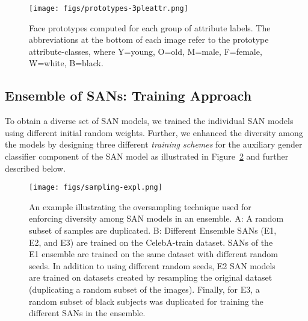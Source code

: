 \documentclass[10pt,twocolumn,letterpaper]{article}
\begin{document}
\begin{figure}
\begin{center}
   \texttt{[image: figs/prototypes-3pleattr.png]}
\end{center}
   \caption{Face prototypes computed for each group of  attribute labels. The abbreviations at the bottom of each image refer to the prototype attribute-classes, where Y=young, O=old, M=male, F=female, W=white, B=black.}
\label{fig:gender-prototypes}
\end{figure}

\subsection{Ensemble of SANs: Training Approach}

To obtain a diverse set of SAN models, we trained the individual SAN models using different initial random weights. Further, we enhanced the diversity among the models by designing three different {\em training schemes} for the auxiliary gender classifier component of the SAN model as illustrated in Figure~\ref{fig:example-oversampling} and further described below.

\begin{figure}
\begin{center}
   \texttt{[image: figs/sampling-expl.png]}
\end{center}
   \caption{An example illustrating the oversampling technique used for enforcing diversity among SAN models in an ensemble. A: A random subset of samples are duplicated. B: Different Ensemble SANs (E1, E2, and E3) are trained on the CelebA-train dataset. SANs of the E1 ensemble are trained on the same dataset with different random seeds. In addition to using different random seeds, E2 SAN models are trained on datasets created by resampling the original dataset (duplicating a random subset of the images). Finally, for E3, a random subset of black subjects was duplicated for training the different SANs in the ensemble.}
\label{fig:example-oversampling}
\end{figure}
\end{document}
